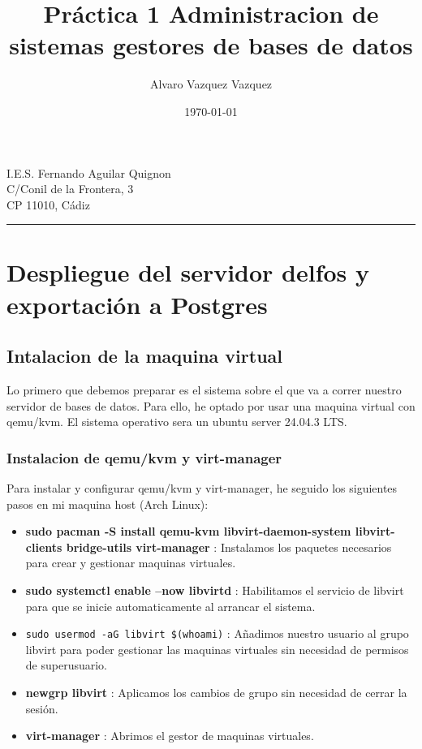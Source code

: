 \documentclass[a4paper,12pt]{article}
\title{Práctica 1 Administracion de sistemas gestores de bases de datos}
\author{Alvaro Vazquez Vazquez}
\date{\today}
\begin{document}
\maketitle

\noindent
I.E.S. Fernando Aguilar Quignon \\
C/Conil de la Frontera, 3 \\
CP 11010, Cádiz \\
\hrule

\section*{Despliegue del servidor delfos y exportación a Postgres}


\subsection{Intalacion de la maquina virtual}

Lo primero que debemos preparar es el sistema sobre el que va a correr nuestro servidor de bases de datos. Para ello, he optado por usar una maquina virtual con qemu/kvm. El sistema operativo sera un ubuntu server 24.04.3 LTS.






\subsubsection{Instalacion de qemu/kvm y virt-manager}

Para instalar y configurar qemu/kvm y virt-manager, he seguido los siguientes pasos en mi maquina host (Arch Linux):  


\begin{itemize}
    \item \textbf{sudo pacman -S install qemu-kvm libvirt-daemon-system libvirt-clients bridge-utils virt-manager} : Instalamos los paquetes necesarios para crear y gestionar maquinas virtuales.
    \item \textbf{sudo systemctl enable --now libvirtd} : Habilitamos el servicio de libvirt para que se inicie automaticamente al arrancar el sistema.
    \item \texttt{sudo usermod -aG libvirt \$(whoami)} : Añadimos nuestro usuario al grupo libvirt para poder gestionar las maquinas virtuales sin necesidad de permisos de superusuario.
    \item \textbf{newgrp libvirt} : Aplicamos los cambios de grupo sin necesidad de cerrar la sesión.
    \item \textbf{virt-manager} : Abrimos el gestor de maquinas virtuales.
\end{itemize}
\end{document}
